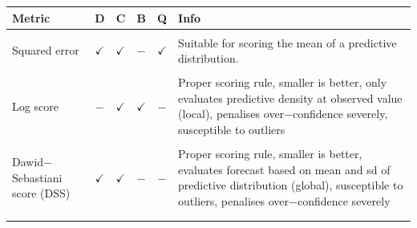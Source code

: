 \documentclass[
]{jss}
\begin{document}
\begin{CodeChunk}
\begingroup\fontsize{7.5}{9.5}\selectfont
\begin{longtable}[t]{>{\raggedright\arraybackslash}p{2.9cm}cccc>{\raggedright\arraybackslash}p{9.3cm}}
\toprule
Metric & D & C & B & Q & Info\\
\midrule
\cellcolor{gray!6}{Absolute error} & \cellcolor{gray!6}{$\checkmark$} & \cellcolor{gray!6}{$\checkmark$} & \cellcolor{gray!6}{$-$} & \cellcolor{gray!6}{$\checkmark$} & \cellcolor{gray!6}{Suitable for scoring the median of a predictive distribution}\\
\addlinespace
Squared error & $\checkmark$ & $\checkmark$ & $-$ & $\checkmark$ & Suitable for scoring the mean of a predictive distribution.\\
\addlinespace
\cellcolor{gray!6}{(Continuous) ranked probability score (CRPS)} & \cellcolor{gray!6}{$\checkmark$} & \cellcolor{gray!6}{$\checkmark$} & \cellcolor{gray!6}{$-$} & \cellcolor{gray!6}{$-$} & \cellcolor{gray!6}{Proper scoring rule (smaller is better), takes entire predictive distribution into account (global), penalises over$-$ and under$-$confidence similarly, stable handling of outliers}\\
\addlinespace
Log score & $-$ & $\checkmark$ & $\checkmark$ & $-$ & Proper scoring rule, smaller is better, only evaluates predictive density at observed value (local), penalises over$-$confidence severely, susceptible to outliers\\
\addlinespace
\cellcolor{gray!6}{(Weighted) interval score (WIS)} & \cellcolor{gray!6}{$\checkmark$} & \cellcolor{gray!6}{$\checkmark$} & \cellcolor{gray!6}{$-$} & \cellcolor{gray!6}{$\checkmark$} & \cellcolor{gray!6}{Proper scoring rule, smaller is better, similar properties to CRPS and converges to CRPS for an increasing number of equally spaced intervals}\\
\addlinespace
Dawid$-$Sebastiani score (DSS) & $\checkmark$ & $\checkmark$ & $-$ & $-$ & Proper scoring rule, smaller is better, evaluates forecast based on mean and sd of predictive distribution (global), susceptible to outliers, penalises over$-$confidence severely\\
\addlinespace
\cellcolor{gray!6}{Brier score (BS)} & \cellcolor{gray!6}{$-$} & \cellcolor{gray!6}{$-$} & \cellcolor{gray!6}{$\checkmark$} & \cellcolor{gray!6}{$-$} & \cellcolor{gray!6}{Proper scoring rule, smaller is better, equals CRPS for binary outcomes, penalises over$-$ and under$-$confidence similarly}\\
\addlinespace

\end{longtable}
\end{CodeChunk}
\end{document}
